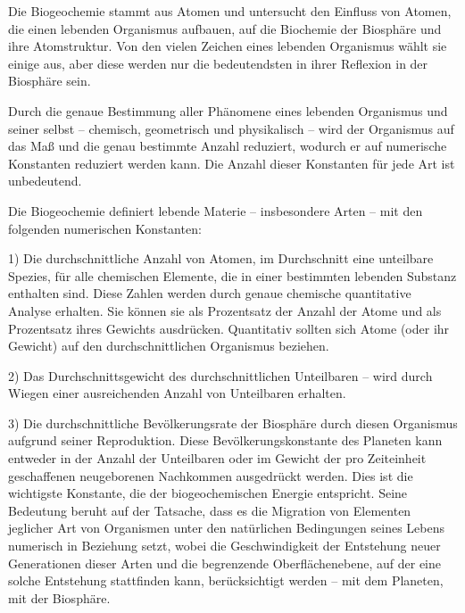 \documentclass[11pt,a4paper]{book}
\begin{document}
Die Biogeochemie stammt aus Atomen und untersucht den Einfluss von Atomen, die einen lebenden Organismus aufbauen, auf die Biochemie der Biosphäre und ihre Atomstruktur. Von den vielen Zeichen eines lebenden Organismus wählt sie einige aus, aber diese werden nur die bedeutendsten in ihrer Reflexion in der Biosphäre sein.



Durch die genaue Bestimmung aller Phänomene eines lebenden Organismus und seiner selbst -- chemisch, geometrisch und physikalisch -- wird der Organismus auf das Maß und die genau bestimmte Anzahl reduziert, wodurch er auf numerische Konstanten reduziert werden kann. Die Anzahl dieser Konstanten für jede Art ist unbedeutend.



Die Biogeochemie definiert lebende Materie -- insbesondere Arten -- mit den folgenden numerischen Konstanten:



1) Die durchschnittliche Anzahl von Atomen, im Durchschnitt eine unteilbare Spezies, für alle chemischen Elemente, die in einer bestimmten lebenden Substanz enthalten sind. Diese Zahlen werden durch genaue chemische quantitative Analyse erhalten. Sie können sie als Prozentsatz der Anzahl der Atome und als Prozentsatz ihres Gewichts ausdrücken. Quantitativ sollten sich Atome (oder ihr Gewicht) auf den durchschnittlichen Organismus beziehen.



2) Das Durchschnittsgewicht des durchschnittlichen Unteilbaren -- wird durch Wiegen einer ausreichenden Anzahl von Unteilbaren erhalten.



3) Die durchschnittliche Bevölkerungsrate der Biosphäre durch diesen Organismus aufgrund seiner Reproduktion. Diese Bevölkerungskonstante des Planeten kann entweder in der Anzahl der Unteilbaren oder im Gewicht der pro Zeiteinheit geschaffenen neugeborenen Nachkommen ausgedrückt werden. Dies ist die wichtigste Konstante, die der biogeochemischen Energie entspricht. Seine Bedeutung beruht auf der Tatsache, dass es die Migration von Elementen jeglicher Art von Organismen unter den natürlichen Bedingungen seines Lebens numerisch in Beziehung setzt, wobei die Geschwindigkeit der Entstehung neuer Generationen dieser Arten und die begrenzende Oberflächenebene, auf der eine solche Entstehung stattfinden kann, berücksichtigt werden -- mit dem Planeten, mit der Biosphäre.
\end{document}
